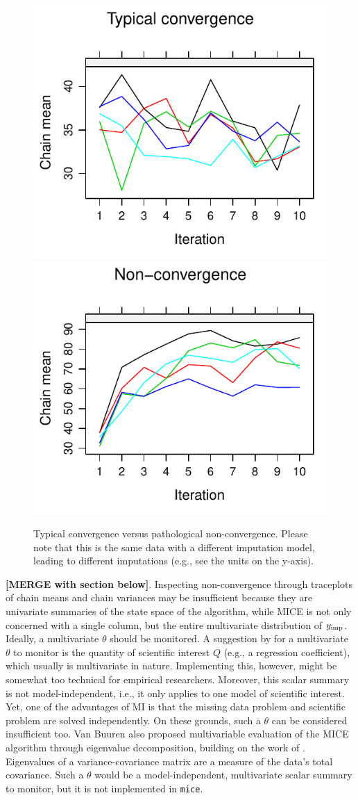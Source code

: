 \documentclass[Royal,times,sageh]{sagej}
\begin{document}
\begin{figure}

{\centering \includegraphics[width=.49\linewidth]{2.Manuscript_files/figure-latex/non-conv-1} \includegraphics[width=.49\linewidth]{2.Manuscript_files/figure-latex/non-conv-2} 

}

\caption{Typical convergence versus pathological non-convergence. Please note that this is the same data with a different imputation model, leading to different imputations (e.g., see the units on the y-axis).}\label{fig:non-conv}
\end{figure}

\textbf{{[}MERGE with section below{]}}. Inspecting non-convergence through traceplots of chain means and chain variances may be insufficient because they are univariate summaries of the state space of the algorithm, while MICE is not only concerned with a single column, but the entire multivariate distribution of \(y_{\rm imp}\). Ideally, a multivariate \(\theta\) should be monitored. A suggestion by \citet{buur18} for a multivariate \(\theta\) to monitor is the quantity of scientific interest \(Q\) (e.g., a regression coefficient), which usually is multivariate in nature. Implementing this, however, might be somewhat too technical for empirical researchers. Moreover, this scalar summary is not model-independent, i.e., it only applies to one model of scientific interest. Yet, one of the advantages of MI is that the missing data problem and scientific problem are solved independently. On these grounds, such a \(\theta\) can be considered insufficient too. Van Buuren \citeyearpar[\(\S\) 4.5.2]{buur18} also proposed multivariable evaluation of the MICE algorithm through eigenvalue decomposition, building on the work of \citet{mack03}. Eigenvalues of a variance-covariance matrix are a measure of the data's total covariance. Such a \(\theta\) would be a model-independent, multivariate scalar summary to monitor, but it is not implemented in \texttt{mice}.
\end{document}
